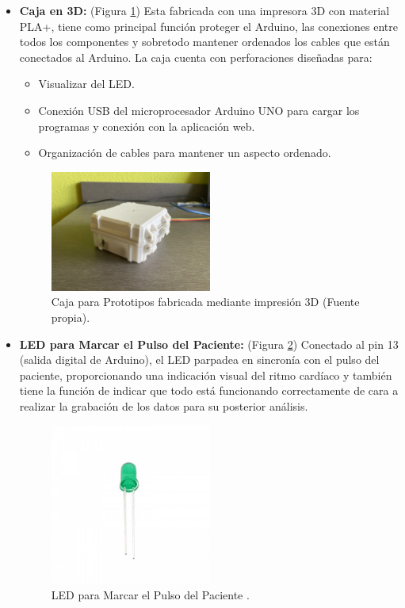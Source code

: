 \begin{itemize}
\item \textbf{Caja en 3D:} (Figura \ref{fig:Caja
})
Esta fabricada con una impresora 3D con material PLA+, tiene como principal función proteger el Arduino, las conexiones entre todos los componentes y sobretodo mantener ordenados los cables que están conectados al Arduino. La caja cuenta con perforaciones diseñadas para:
\begin{itemize}
\item Visualizar del LED.
\item Conexión USB del microprocesador Arduino UNO para cargar los programas y conexión con la aplicación web.
\item Organización de cables para mantener un aspecto ordenado.
\end{itemize}

\begin{figure}[h]
\centering
\includegraphics[width=0.5\textwidth]{img/caja3d.jpg}
\caption{Caja para Prototipos fabricada mediante impresión 3D (Fuente propia).}
\label{fig:Caja
}
\end{figure}
\end{itemize}

\begin{itemize}
\item \textbf{LED para Marcar el Pulso del Paciente:} (Figura \ref{fig:LED
})
Conectado al pin 13 (salida digital de Arduino), el LED parpadea en sincronía con el pulso del paciente, proporcionando una indicación visual del ritmo cardíaco y también tiene la función de indicar que todo está funcionando correctamente de cara a realizar la grabación de los datos para su posterior análisis.

\begin{figure}[h]
\centering
\includegraphics[width=0.5\textwidth]{img/ledverde.jpg}
\caption{LED para Marcar el Pulso del Paciente \cite{LED}.}
\label{fig:LED
}
\end{figure}
\end{itemize}

